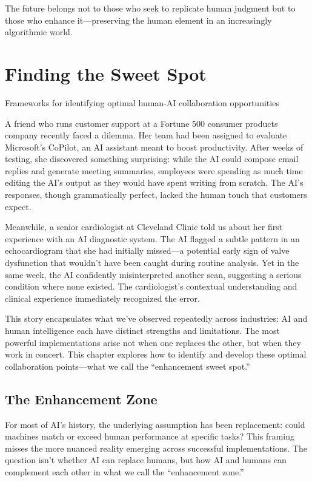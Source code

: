 \documentclass[
  Letterpaper,
]{scrbook}
\begin{document}
The future belongs not to those who seek to replicate human judgment but
to those who enhance it---preserving the human element in an
increasingly algorithmic world.


\chapter{Finding the Sweet Spot}\label{finding-the-sweet-spot}

Frameworks for identifying optimal human-AI collaboration opportunities

\hfill\break

A friend who runs customer support at a Fortune 500 consumer products
company recently faced a dilemma. Her team had been assigned to evaluate
Microsoft's CoPilot, an AI assistant meant to boost productivity. After
weeks of testing, she discovered something surprising: while the AI
could compose email replies and generate meeting summaries, employees
were spending as much time editing the AI's output as they would have
spent writing from scratch. The AI's responses, though grammatically
perfect, lacked the human touch that customers expect.

Meanwhile, a senior cardiologist at Cleveland Clinic told us about her
first experience with an AI diagnostic system. The AI flagged a subtle
pattern in an echocardiogram that she had initially missed---a potential
early sign of valve dysfunction that wouldn't have been caught during
routine analysis. Yet in the same week, the AI confidently
misinterpreted another scan, suggesting a serious condition where none
existed. The cardiologist's contextual understanding and clinical
experience immediately recognized the error.

This story encapsulates what we've observed repeatedly across
industries: AI and human intelligence each have distinct strengths and
limitations. The most powerful implementations arise not when one
replaces the other, but when they work in concert. This chapter explores
how to identify and develop these optimal collaboration points---what we
call the ``enhancement sweet spot.''

\section{The Enhancement Zone}\label{the-enhancement-zone}

For most of AI's history, the underlying assumption has been
replacement: could machines match or exceed human performance at
specific tasks? This framing misses the more nuanced reality emerging
across successful implementations. The question isn't whether AI can
replace humans, but how AI and humans can complement each other in what
we call the ``enhancement zone.''
\end{document}
